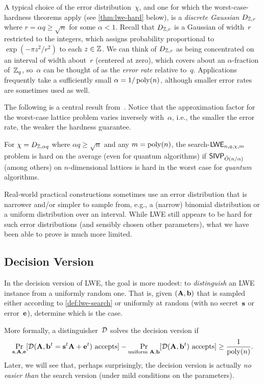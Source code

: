 \documentclass[11pt]{article}
\begin{document}
A typical choice of the error distribution~$\chi$, and one for which
the worst-case-hardness theorems apply (see \cref{thm:lwe-hard}
below), is a \emph{discrete Gaussian} $D_{\mathbb{Z}, r}$ where
$r = \alpha q \geq \sqrt{n}$ for some $\alpha < 1$. Recall that
$D_{\mathbb{Z},r}$ is a Gaussian of width~$r$ restricted to the integers,
which assigns probability proportional to $\exp(-\pi z^{2}/r^{2})$ to
each $z \in \mathbb{Z}$. We can think of $D_{\mathbb{Z},r}$ as being concentrated on
an interval of width about~$r$ (centered at zero), which covers about
an $\alpha$-fraction of~$\mathbb{Z}_q$, so~$\alpha$ can be thought of as the
\emph{error rate} relative to~$q$. Applications frequently take a
sufficiently small $\alpha = 1/\operatorname{poly}(n)$, although smaller error rates
are sometimes used as well.

The following is a central result
from~\cite{DBLP:journals/jacm/Regev09}. Notice that the approximation
factor for the worst-case lattice problem varies inversely
with~$\alpha$, i.e., the smaller the error rate, the weaker the
hardness guarantee.

\begin{theorem}
  \label{thm:lwe-hard}
  For $\chi = D_{\mathbb{Z},\alpha q}$ where $\alpha q \geq \sqrt{n}$ and any
  $m=\operatorname{poly}(n)$, the search-$\mathsf{LWE}_{n,q,\chi,m}$ problem is hard on the
  average (even for quantum algorithms) if $\mathsf{SIVP}_{\tilde{O}(n/\alpha)}$
  (among others) on $n$-dimensional lattices is hard in the worst case
  for \emph{quantum} algorithms.
\end{theorem}

Real-world practical constructions sometimes use an error distribution
that is narrower and/or simpler to sample from, e.g., a (narrow)
binomial distribution or a uniform distribution over an interval.
While LWE still appears to be hard for such error distributions (and
sensibly chosen other parameters), what we have been able to prove is
much more limited.

\subsection{Decision Version}
\label{sec:decision}

In the decision version of LWE, the goal is more modest: to
\emph{distinguish} an LWE instance from a uniformly random one. That
is, given $(\mathbf{A}, \mathbf{b})$ that is sampled either according to
\cref{def:lwe-search} or uniformly at random (with no secret~$\mathbf{s}$
or error~$\mathbf{e}$), determine which is the case.

More formally, a distinguisher~$\mathcal{D}$ solves the decision version if
\begin{align*}
  \Pr_{\mathbf{s},\mathbf{A},\mathbf{e}}[\mathcal{D}(\mathbf{A}, \mathbf{b}^t = \mathbf{s}^t\mathbf{A}+\mathbf{e}^t) \text{ accepts}] - 
  \Pr_{\text{uniform } \mathbf{A},\mathbf{b}}[\mathcal{D}(\mathbf{A}, \mathbf{b}^t) \text{ accepts}] \geq
  \frac{1}{\operatorname{poly}(n)} .
\end{align*}
Later, we will see that, perhaps surprisingly, the decision version is
actually \emph{no easier than} the search version (under mild
conditions on the parameters).
\end{document}
